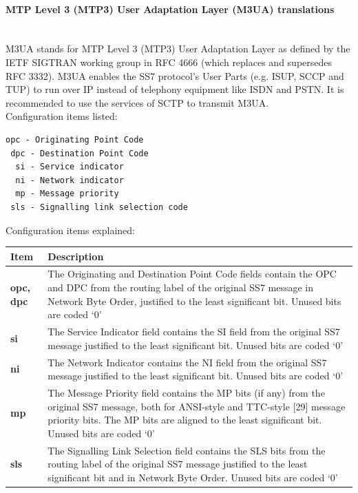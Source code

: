 \documentclass[a4paper,latin]{paper}
\begin{document}
\paragraph{MTP Level 3 (MTP3) User Adaptation Layer (M3UA) translations}
\mbox{}\\
M3UA stands for MTP Level 3 (MTP3) User Adaptation Layer as defined by the IETF SIGTRAN working group in RFC 4666 (which replaces and supersedes RFC 3332). 
M3UA enables the SS7 protocol's User Parts (e.g. ISUP, SCCP and TUP) to run over IP instead of telephony equipment like ISDN and PSTN. 
It is recommended to use the services of SCTP to transmit M3UA.\\

\noindent{}Configuration items listed:
\begin{lstlisting}[style=BashInputStyle, belowskip=\baselineskip]
 opc - Originating Point Code
 dpc - Destination Point Code
  si - Service indicator     
  ni - Network indicator
  mp - Message priority 
 sls - Signalling link selection code
\end{lstlisting}
\noindent{}Configuration items explained:\\
\begin{tabularx}{\textwidth}{ | l | X |}
	\hline
	Item	 				& Description \\
	\hline
	\textbf{opc, dpc}			& The Originating and Destination Point Code fields contain the OPC
						  and DPC from the routing label of the original SS7 message in Network
						  Byte Order, justified to the least significant bit.  Unused bits are
						  coded `0' \\
	\textbf{si}				& The Service Indicator field contains the SI field from the original
						  SS7 message justified to the least significant bit.  Unused bits are
						  coded `0' \\
	\textbf{ni}				& The Network Indicator contains the NI field from the original SS7
   						  message justified to the least significant bit.  Unused bits are
   						  coded `0' \\ 
	\textbf{mp}				& The Message Priority field contains the MP bits (if any) from the
   						  original SS7 message, both for ANSI-style and TTC-style [29] message
   						  priority bits. The MP bits are aligned to the least significant bit.
   						  Unused bits are coded `0'\\ 
	\textbf{sls}				& The Signalling Link Selection field contains the SLS bits from the
   						  routing label of the original SS7 message justified to the least
   						  significant bit and in Network Byte Order.  Unused bits are coded
   						  `0'\\ 
	\hline
\end{tabularx}
\clearpage
\end{document}
